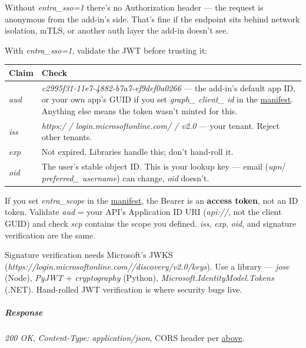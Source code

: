 \documentclass[11pt]{article}
\begin{document}
Without \emph{entra\_\allowbreak{}sso=1} there's no Authorization header — the request is anonymous from the add-in's side. That's fine if the endpoint sits behind network isolation, mTLS, or another auth layer the add-in doesn't see.


With \emph{entra\_\allowbreak{}sso=1}, validate the JWT before trusting it:


\begingroup
\small
\setlength{\tabcolsep}{2pt}
\begin{longtable}{>{\RaggedRight\arraybackslash\hspace{0pt}}p{}>{\RaggedRight\arraybackslash\hspace{0pt}}p{}}
\toprule
{} \textbf{Claim} & \textbf{Check} \\
\midrule
{} \emph{aud} & \emph{c2995f31-11e7-4882-b7a7-ef9def0a0266} — the add-in's default app ID, or your own app's GUID if you set \emph{graph\_\allowbreak{} client\_\allowbreak{} id} in the \href{manifest.md\#entra-sso}{manifest}. Anything else means the token wasn't minted for this. \\
{} \emph{iss} & \emph{https:/ / login.microsoftonline.com/ / v2.0} — your tenant. Reject other tenants. \\
{} \emph{exp} & Not expired. Libraries handle this; don't hand-roll it. \\
{} \emph{oid} & The user's stable object ID. This is your lookup key — email (\emph{upn}/ \emph{preferred\_\allowbreak{} username}) can change, \emph{oid} doesn't. \\
\bottomrule
\end{longtable}
\endgroup

If you set \emph{entra\_\allowbreak{}scope} in the \href{manifest.md\#entra-sso}{manifest}, the Bearer is an \textbf{access token}, not an ID token. Validate \emph{aud} = your API's Application ID URI (\emph{api://}, not the client GUID) and check \emph{scp} contains the scope you defined. \emph{iss}, \emph{exp}, \emph{oid}, and signature verification are the same.


Signature verification needs Microsoft's JWKS (\emph{https://login.microsoftonline.com//discovery/v2.0/keys}). Use a library — \emph{jose} (Node), \emph{PyJWT} + \emph{cryptography} (Python), \emph{Microsoft.IdentityModel.Tokens} (.NET). Hand-rolled JWT verification is where security bugs live.


\subparagraph{Response}\mbox{}\par

\emph{200 OK}, \emph{Content-Type: application/json}, CORS header per \href{\#cors--every-url-needs-it}{above}.
\end{document}
